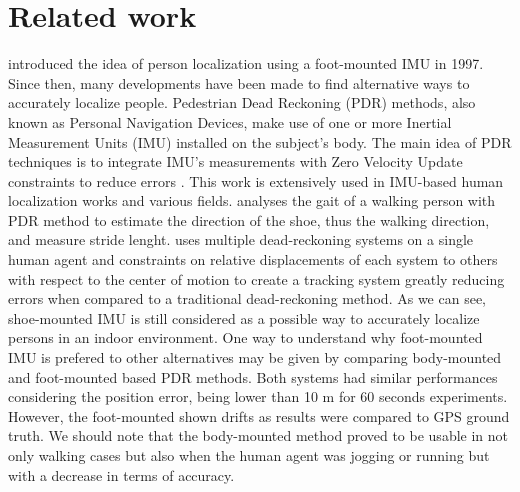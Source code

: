 
\section{Related work}\label{sec:relatedWork}

\cite{hutchings1998system} introduced the idea of person localization using a foot-mounted IMU in 1997. Since then, many developments have been made to find alternative ways to accurately localize people.
Pedestrian Dead Reckoning (PDR) methods, also known as Personal Navigation Devices, make use of one or more Inertial Measurement Units (IMU) installed on the subject's body.
The main idea of PDR techniques is to integrate IMU's measurements with Zero Velocity Update constraints to reduce errors \cite{ojeda2007personal}.
This work is extensively used in IMU-based human localization works and various fields. \cite{kwanmuang2015phd} analyses the gait of a walking person 
with PDR method to estimate the direction of the shoe, thus the walking direction, and measure stride lenght. \cite{jin2011robust} uses multiple dead-reckoning systems on a single human 
agent and constraints on relative displacements of each system to others with respect to the center of motion to create a tracking system
greatly reducing errors when compared to a traditional dead-reckoning method. As we can see, shoe-mounted IMU is still considered as a possible way to
accurately localize persons in an indoor environment. One way to understand why foot-mounted IMU is prefered to other alternatives may be given by \cite{groves2007inertial} 
comparing body-mounted and foot-mounted based PDR methods. 
Both systems had similar performances considering the position error, being lower than 10 m for 60 seconds experiments. However, the foot-mounted shown drifts as results were compared
to GPS ground truth. We should note that the body-mounted method proved to be usable in not only walking cases but also when the human agent was jogging or running but with a decrease in terms of accuracy.

